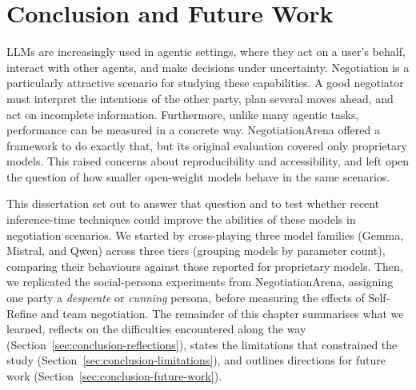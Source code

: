
\chapter{Conclusion and Future Work} \label{chap:conclusion}

\ac{LLM}s are increasingly used in agentic settings, where they act on a user's behalf, interact with other agents, and make decisions under uncertainty. Negotiation is a particularly attractive scenario for studying these capabilities. A good negotiator must interpret the intentions of the other party, plan several moves ahead, and act on incomplete information. Furthermore, unlike many agentic tasks, performance can be measured in a concrete way. NegotiationArena \cite{bianchi_how_2024} offered a framework to do exactly that, but its original evaluation covered only proprietary models. This raised concerns about reproducibility and accessibility, and left open the question of how smaller open-weight models behave in the same scenarios.

This dissertation set out to answer that question and to test whether recent inference-time techniques could improve the abilities of these models in negotiation scenarios. We started by cross-playing three model families (Gemma, Mistral, and Qwen) across three tiers (grouping models by parameter count), comparing their behaviours against those reported for proprietary models. Then, we replicated the social-persona experiments from NegotiationArena, assigning one party a \textit{desperate} or \textit{cunning} persona, before measuring the effects of Self-Refine and team negotiation. The remainder of this chapter summarises what we learned, reflects on the difficulties encountered along the way (Section~\ref{sec:conclusion-reflections}), states the limitations that constrained the study (Section~\ref{sec:conclusion-limitations}), and outlines directions for future work (Section~\ref{sec:conclusion-future-work}).

